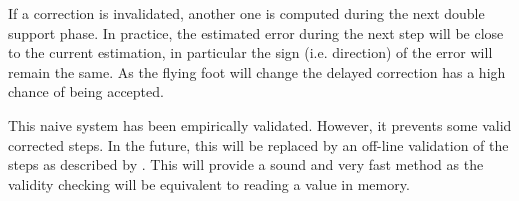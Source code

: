 If a correction is invalidated, another one is computed during the
next double support phase. In practice, the estimated error during the
next step will be close to the current estimation, in particular the
sign (i.e. direction) of the error will remain the same. As the flying
foot will change the delayed correction has a high chance of being
accepted.


This naive system has been empirically validated. However, it prevents
some valid corrected steps. In the future, this will be replaced by an
off-line validation of the steps as described by
\cite{10icra.perrin}. This will provide a sound and very fast method as
the validity checking will be equivalent to reading a value in memory.

\FloatBarrier

